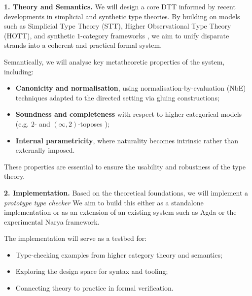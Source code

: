 \documentclass[a4paper,11pt]{article}
\renewcommand{\paragraph}[1]{\textbf{#1.}}
\begin{document}
\paragraph{1. Theory and Semantics}
We will design a core DTT informed by recent developments in simplicial and synthetic type theories. By building on models such as Simplicial Type Theory (STT), Higher Observational Type Theory (HOTT), and synthetic $1$-category frameworks \cite{riehlshulman2017, licata2016, north_2019, altenkirch_neumann_2024}, we aim to unify disparate strands into a coherent and practical formal system.

Semantically, we will analyse key metatheoretic properties of the system, including:
\begin{itemize}
  \item \textbf{Canonicity and normalisation}, using normalisation-by-evaluation (NbE) techniques adapted to the directed setting via gluing constructions;
  \item \textbf{Soundness and completeness} with respect to higher
    categorical models
    (e.g. $2$- and $(\infty,2)$-toposes \cite{street2topos,abellan-martini});
  \item \textbf{Internal parametricity}, where naturality becomes intrinsic rather than externally imposed.
\end{itemize}
These properties are essential to ensure the usability and robustness of the type theory.

\paragraph{2. Implementation}
Based on the theoretical foundations, we will implement a
\emph{prototype type checker}
We aim to build this either as a standalone implementation or as an
extension of an existing system such as \textsf{Agda} or the
experimental \textsf{Narya} \cite{Shulman2025Narya} framework.

The implementation will serve as a testbed for:
\begin{itemize}
  \item Type-checking examples from higher category theory and semantics;
  \item Exploring the design space for syntax and tooling;
  \item Connecting theory to practice in formal verification.
\end{itemize}
\end{document}
